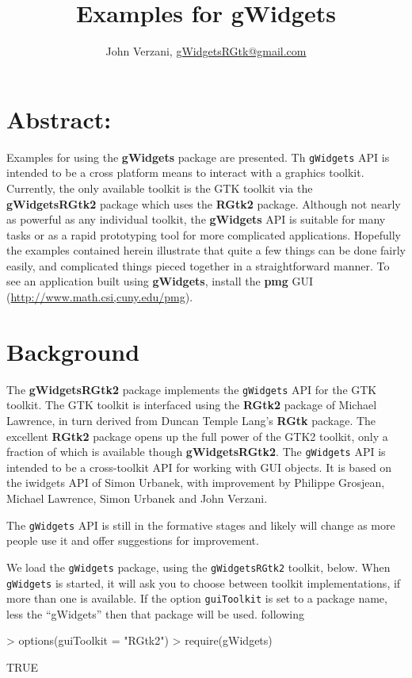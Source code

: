 \documentclass[12pt]{article}
\newcommand{\RCode}[1]{\texttt{#1}}
\newcommand{\RPackage}[1]{\textbf{#1}}
\begin{document}
\thispagestyle{plain}
\title{Examples for gWidgets}

\author{John Verzani, \url{gWidgetsRGtk@gmail.com}}
\maketitle

\section*{Abstract:}
Examples for using the \RPackage{gWidgets} package are presented. Th
\RCode{gWidgets} API is intended to be a cross platform means to
interact with a graphics toolkit. Currently, the only available
toolkit is the GTK toolkit via the \RPackage{gWidgetsRGtk2} package
which uses the \RPackage{RGtk2} package. Although not nearly as
powerful as any individual toolkit, the \RPackage{gWidgets} API is
suitable for many tasks or as a rapid prototyping tool for more
complicated applications. Hopefully the examples contained herein
illustrate that quite a few things can be done fairly easily, and
complicated things pieced together in a straightforward manner. To see
an application built using \RPackage{gWidgets}, install the
\RPackage{pmg} GUI (\url{http://www.math.csi,cuny.edu/pmg}).

\setcounter{tocdepth}{3}
\tableofcontents

\section{Background}
The \RPackage{gWidgetsRGtk2} package implements the \RCode{gWidgets} API for the
GTK toolkit. The GTK toolkit is interfaced using the \RPackage{RGtk2}
package of Michael Lawrence, in turn derived from Duncan Temple Lang's
\RPackage{RGtk} package. The excellent \RPackage{RGtk2} package opens up
the full power of the GTK2 toolkit, only a fraction of which is
available though \RPackage{gWidgetsRGtk2}.  The \RCode{gWidgets} API is intended
to be a cross-toolkit API for working with GUI objects. It is based on
the iwidgets API of Simon Urbanek, with improvement by Philippe
Grosjean, Michael Lawrence, Simon Urbanek and John Verzani.

The \RCode{gWidgets} API is still in the formative stages and likely will
change as more people use it and offer suggestions for improvement.

We  load the \RCode{gWidgets} package, using the \RCode{gWidgetsRGtk2}
toolkit, below. When \RCode{gWidgets} is started, it will ask you to choose
between toolkit implementations, if more than one is available. If the
option \RCode{guiToolkit} is set to a package name, less the
``gWidgets'' then that package will be used. 
following 
\begin{Schunk}
\begin{Sinput}
> options(guiToolkit = "RGtk2")
> require(gWidgets)
\end{Sinput}
\begin{Soutput}
[1] TRUE
\end{Soutput}
\end{Schunk}
\end{document}
